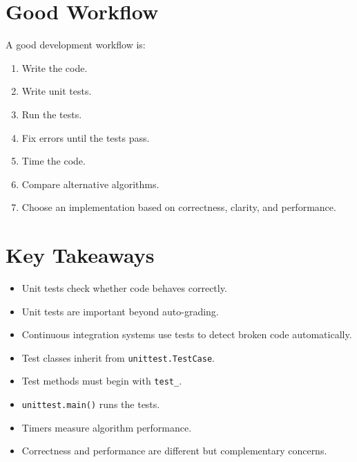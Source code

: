 \documentclass[11pt]{article}
\begin{document}
\section{Good Workflow}

A good development workflow is:

\begin{enumerate}
    \item Write the code.
    \item Write unit tests.
    \item Run the tests.
    \item Fix errors until the tests pass.
    \item Time the code.
    \item Compare alternative algorithms.
    \item Choose an implementation based on correctness, clarity, and performance.
\end{enumerate}

\section{Key Takeaways}

\begin{itemize}
    \item Unit tests check whether code behaves correctly.
    \item Unit tests are important beyond auto-grading.
    \item Continuous integration systems use tests to detect broken code automatically.
    \item Test classes inherit from \texttt{unittest.TestCase}.
    \item Test methods must begin with \texttt{test\_}.
    \item \texttt{unittest.main()} runs the tests.
    \item Timers measure algorithm performance.
    \item Correctness and performance are different but complementary concerns.
\end{itemize}
\end{document}
